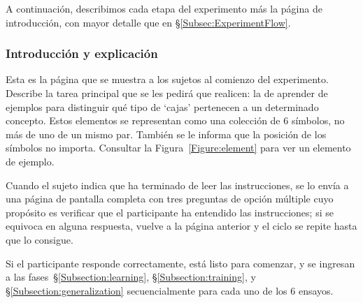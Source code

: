 A continuación, describimos cada etapa del experimento más la página de introducción, con mayor detalle que en \S\ref{Subsec:ExperimentFlow}.

\subsubsection{Introducción y explicación}

Esta es la página que se muestra a los sujetos al comienzo del experimento. Describe la tarea principal que se les pedirá que realicen: la de aprender de ejemplos para distinguir qué tipo de `cajas' pertenecen a un determinado concepto. Estos elementos se representan como una colección de 6 símbolos, no más de uno de un mismo par. También se le informa que la posición de los símbolos no importa. Consultar la Figura~\ref{Figure:element} para ver un elemento de ejemplo.

Cuando el sujeto indica que ha terminado de leer las instrucciones, se lo envía a una página de pantalla completa con tres preguntas de opción múltiple cuyo propósito es verificar que el participante ha entendido las instrucciones; si se equivoca en alguna respuesta, vuelve a la página anterior y el ciclo se repite hasta que lo consigue.

Si el participante responde correctamente, está listo para comenzar, y se ingresan a las fases~\S\ref{Subsection:learning}, \S\ref{Subsection:training}, y \S\ref{Subsection:generalization} secuencialmente para cada uno de los 6 ensayos.

